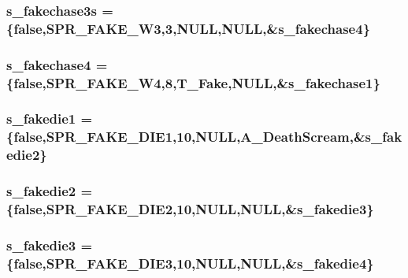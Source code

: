 \label{WL__ACT2_8C_a7c35860a0338dd90fe8bca8d5edfa5fe}
\hypertarget{WL__ACT2_8C_ad3bf3edfd585c73ed103693b4a859729}{
\subsubsection[{s\_\-fakechase3s}]{ {\bf s\_\-fakechase3s} = \{false,SPR\_\-FAKE\_\-W3,3,NULL,NULL,\&{\bf s\_\-fakechase4}\}}}
\label{WL__ACT2_8C_ad3bf3edfd585c73ed103693b4a859729}
\hypertarget{WL__ACT2_8C_ac705f6abd283bd74f19c7e0b340cf4a7}{
\subsubsection[{s\_\-fakechase4}]{ {\bf s\_\-fakechase4} = \{false,SPR\_\-FAKE\_\-W4,8,T\_\-Fake,NULL,\&{\bf s\_\-fakechase1}\}}}
\label{WL__ACT2_8C_ac705f6abd283bd74f19c7e0b340cf4a7}
\hypertarget{WL__ACT2_8C_ac2dcb48ef7d156d57e236587d00b62f9}{
\subsubsection[{s\_\-fakedie1}]{ {\bf s\_\-fakedie1} = \{false,SPR\_\-FAKE\_\-DIE1,10,NULL,A\_\-DeathScream,\&{\bf s\_\-fakedie2}\}}}
\label{WL__ACT2_8C_ac2dcb48ef7d156d57e236587d00b62f9}
\hypertarget{WL__ACT2_8C_a10237321111cde1398b8667d7f4af4fb}{
\subsubsection[{s\_\-fakedie2}]{ {\bf s\_\-fakedie2} = \{false,SPR\_\-FAKE\_\-DIE2,10,NULL,NULL,\&{\bf s\_\-fakedie3}\}}}
\label{WL__ACT2_8C_a10237321111cde1398b8667d7f4af4fb}
\hypertarget{WL__ACT2_8C_a9b8baf4f50daeeb1f9d86dc8576ac8ef}{
\subsubsection[{s\_\-fakedie3}]{ {\bf s\_\-fakedie3} = \{false,SPR\_\-FAKE\_\-DIE3,10,NULL,NULL,\&{\bf s\_\-fakedie4}\}}}

